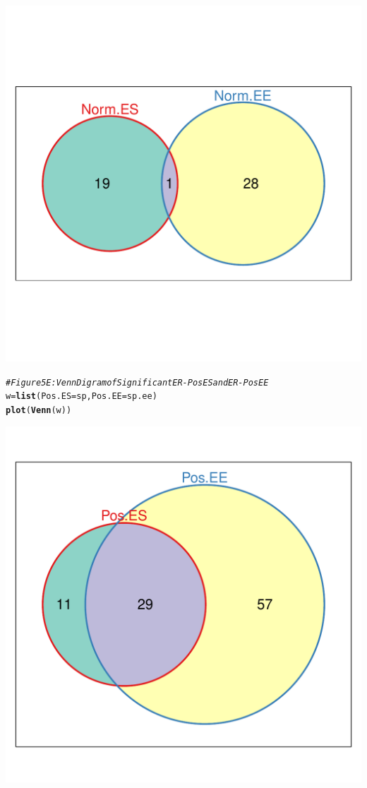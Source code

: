 \documentclass{article}\usepackage[]{graphicx}\usepackage[]{color}
\makeatletter
\def\maxwidth{ %
  \ifdim\Gin@nat@width>\linewidth
    \linewidth
  \else
    \Gin@nat@width
  \fi
}
\newcommand{\hlcom}[1]{\textcolor[rgb]{0.678,0.584,0.686}{\textit{#1}}}%
\newcommand{\hlstd}[1]{\textcolor[rgb]{0.345,0.345,0.345}{#1}}%
\newcommand{\hlkwb}[1]{\textcolor[rgb]{0.69,0.353,0.396}{#1}}%
\newcommand{\hlkwc}[1]{\textcolor[rgb]{0.333,0.667,0.333}{#1}}%
\newcommand{\hlkwd}[1]{\textcolor[rgb]{0.737,0.353,0.396}{\textbf{#1}}}%
\newenvironment{kframe}{%
 \def\at@end@of@kframe{}%
 \ifinner\ifhmode%
  \def\at@end@of@kframe{\end{minipage}}%
  \begin{minipage}{\columnwidth}%
 \fi\fi%
 \def\FrameCommand##1{\hskip\@totalleftmargin \hskip-\fboxsep
 \colorbox{shadecolor}{##1}\hskip-\fboxsep
     \hskip-\linewidth \hskip-\@totalleftmargin \hskip\columnwidth}%
 \MakeFramed {\advance\hsize-\width
   \@totalleftmargin\z@ \linewidth\hsize
   \@setminipage}}%
 {\par\unskip\endMakeFramed%
 \at@end@of@kframe}
\newenvironment{knitrout}{}{} %
\makeatother
\begin{document}
\begin{knitrout}
\includegraphics[width=\maxwidth]{figure/Figure_4__Analysis_of_SANTA_Results-8} 
\begin{kframe}\begin{alltt}
\hlcom{# Figure 5E: Venn Digram of Significant ER-Pos ES and ER-Pos EE}
\hlstd{w}\hlkwb{=}\hlkwd{list}\hlstd{(}\hlkwc{Pos.ES}\hlstd{=sp,}\hlkwc{Pos.EE}\hlstd{=sp.ee)}
\hlkwd{plot}\hlstd{(}\hlkwd{Venn}\hlstd{(w))}
\end{alltt}
\end{kframe}
\includegraphics[width=\maxwidth]{figure/Figure_4__Analysis_of_SANTA_Results-9} 

\end{knitrout}
\end{document}
